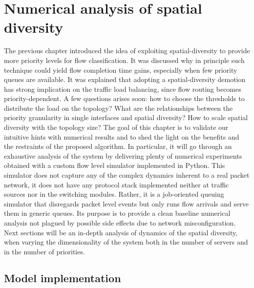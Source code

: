 \chapter{Numerical analysis of spatial diversity}
The previous chapter introduced the idea of exploiting spatial-diversity to provide more priority levels for flow classification. It was discussed why in principle such technique could yield flow completion time gains, especially when few priority queues are available. It was explained that adopting a spatial-diversity demotion has strong implication on the traffic load balancing, since flow routing becomes priority-dependent.  A few questions arises soon: how to choose the thresholds to distribute the load on the topology? What are the relationships between the priority granularity in 
single interfaces and spatial diversity? How to scale spatial diversity with the topology size? The goal of this chapter is to validate our intuitive hints with numerical results and to shed the light on the benefits and the restraints of the proposed algorithm. In particular, it will go through an exhaustive analysis of the system by delivering plenty of numerical experiments obtained with a custom flow level simulator implemented in Python. This simulator does not capture any of the complex dynamics inherent to a real packet network, it does not have any protocol stack implemented neither at traffic sources nor in the switching modules. Rather, it is a job-oriented queuing simulator that disregards packet level events but only runs flow arrivals and serve them in generic queues. Its purpose is to provide a clean baseline numerical analysis not plagued by possible side effects due to network misconfiguration.
Next sections will be an in-depth analysis of dynamics of the spatial diversity, when varying the dimensionality of the system both in the number of servers and in the number of priorities.
\section{Model implementation}

